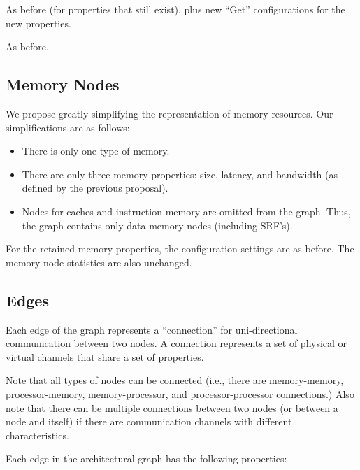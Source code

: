 As before (for properties that still exist), plus new ``Get''
configurations for the new properties.


As before.

\subsection{Memory Nodes}

We propose greatly simplifying the representation of memory resources.
Our simplifications are as follows:

\begin{itemize}

\item There is only one type of memory.

\item There are only three memory properties: size, latency, and
bandwidth (as defined by the previous proposal).

\item Nodes for caches and instruction memory are omitted from the
graph.  Thus, the graph contains only data memory nodes (including
SRF's).

\end{itemize}

For the retained memory properties, the configuration settings are as
before.  The memory node statistics are also unchanged.

\subsection{Edges}

Each edge of the graph represents a ``connection'' for uni-directional
communication between two nodes.  A connection represents a set of
physical or virtual channels that share a set of properties.

Note that all types of nodes can be connected (i.e., there are
memory-memory, processor-memory, memory-processor, and
processor-processor connections.)  Also note that there can be
multiple connections between two nodes (or between a node and itself)
if there are communication channels with different characteristics.


Each edge in the architectural graph has the following properties: \\

